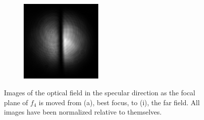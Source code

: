 \begin{figure}[ht]
\begin{subfigure}[b]{4cm}
    \includegraphics[width=4cm,keepaspectratio]{interference/figures/move/123-1.jpg}\caption{}
  \end{subfigure}
  \caption{Images of the optical field in the specular direction as the focal
    plane of $f_4$ is moved from (a), best focus, to (i), the far field.  All
    images have been normalized relative to themselves.}\label{fig:123up}
\end{figure}

